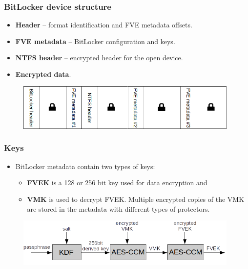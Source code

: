 \documentclass{beamer}
\begin{document}
\begin{frame}
	\frametitle{BitLocker device structure}

	\begin{block}{}
		\begin{itemize}
			\item \textbf{Header} -- format identification and FVE metadata offsets.
			\item \textbf{FVE metadata} -- BitLocker configuration and keys.
			\item \textbf{NTFS header} -- encrypted header for the open device.
			\item \textbf{Encrypted data}.
		\end{itemize}
	\end{block}
	
	\begin{figure}[ht!]
	\begin{center}
  	  \includegraphics[width=11cm]{img/bitlocker-schema.png}
	\end{center}
	\end{figure}

\end{frame}

\begin{frame}
	\frametitle{Keys}

	\begin{block}{}
		\begin{itemize}
			\item BitLocker metadata contain two types of keys:
				\begin{itemize}
					\item \textbf{FVEK} is a 128 or 256 bit key used for data encryption and
					\item \textbf{VMK} is used to decrypt FVEK. Multiple encrypted copies of the VMK are stored in the metadata with different types of protectors.
				\end{itemize}
		\end{itemize}
	\end{block}
	\begin{figure}[ht!]
	\begin{center}
  	  \includegraphics[width=11cm]{img/keys.png}
	\end{center}
	\end{figure}

\end{frame}
\end{document}
